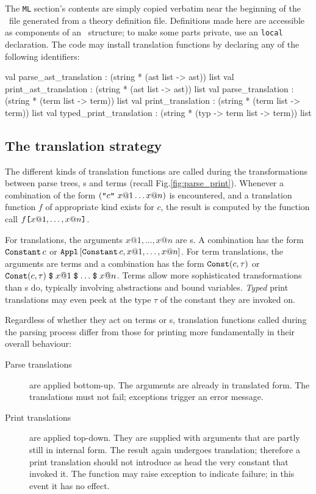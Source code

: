 The {\tt ML} section's contents are simply copied verbatim near the
beginning of the \ML\ file generated from a theory definition file.
Definitions made here are accessible as components of an \ML\ 
structure; to make some parts private, use an \ML{} {\tt local}
declaration.  The {\ML} code may install translation functions by
declaring any of the following identifiers:
\begin{ttbox}
val parse_ast_translation   : (string * (ast list -> ast)) list
val print_ast_translation   : (string * (ast list -> ast)) list
val parse_translation       : (string * (term list -> term)) list
val print_translation       : (string * (term list -> term)) list
val typed_print_translation : (string * (typ -> term list -> term)) list
\end{ttbox}

\subsection{The translation strategy}
The different kinds of translation functions are called during the
transformations between parse trees, \AST{}s and terms (recall
Fig.\ts\ref{fig:parse_print}).  Whenever a combination of the form
$(\mbox{\tt "}c\mbox{\tt "}~x@1 \ldots x@n)$ is encountered, and a translation
function $f$ of appropriate kind exists for $c$, the result is
computed by the \ML{} function call $f \mbox{\tt [} x@1, \ldots, x@n \mbox{\tt ]}$.

For \AST{} translations, the arguments $x@1, \ldots, x@n$ are \AST{}s.
A combination has the form $\mathop{\mbox{\tt Constant}}\nolimits c$ or $\mathop{\mbox{\tt Appl}}\nolimits\,[\mathop{\mbox{\tt Constant}}\nolimits c, x@1,
  \ldots, x@n]$.  For term translations, the arguments are terms and a
combination has the form $\mathop{\mbox{\tt Const}}\nolimits (c, \tau)$ or $\mathop{\mbox{\tt Const}}\nolimits
(c, \tau) \mathrel{\hbox{\tt\$}} x@1 \mathrel{\hbox{\tt\$}} \ldots \mathrel{\hbox{\tt\$}} x@n$.  Terms allow more
sophisticated transformations than \AST{}s do, typically involving
abstractions and bound variables. {\em Typed} print translations may
even peek at the type $\tau$ of the constant they are invoked on.

Regardless of whether they act on terms or \AST{}s, translation
functions called during the parsing process differ from those for
printing more fundamentally in their overall behaviour:
\begin{description}
\item[Parse translations] are applied bottom-up.  The arguments are already
  in translated form.  The translations must not fail; exceptions trigger
  an error message.

\item[Print translations] are applied top-down.  They are supplied with
  arguments that are partly still in internal form.  The result again
  undergoes translation; therefore a print translation should not introduce
  as head the very constant that invoked it.  The function may raise
  exception \xdx{Match} to indicate failure; in this event it has no
  effect.
\end{description}

